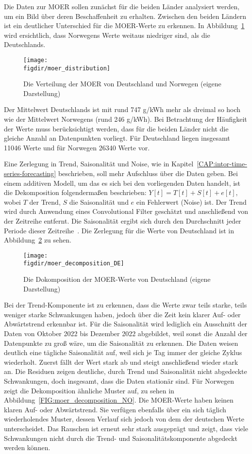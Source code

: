 Die Daten zur \ac{MOER} sollen zunächst für die beiden Länder analysiert werden, um ein Bild über deren Beschaffenheit zu erhalten.
Zwischen den beiden Ländern ist ein deutlicher Unterschied für die MOER-Werte zu erkennen.
In Abbildung~\ref{FIG:moer_distribution} wird ersichtlich, dass Norwegens Werte weitaus niedriger sind, als die Deutschlands.
\begin{figure}
 \caption[Verteilung MOER Deutschland und Norwegen]{Die Verteilung der MOER von Deutschland und Norwegen (eigene Darstellung)}
 {\texttt{[image: \\figdir/moer\_distribution]}}
 \label{FIG:moer_distribution}
\end{figure}
Der Mittelwert Deutschlands ist mit rund 747 g/\ac{kWh} mehr als dreimal so hoch wie der Mittelwert Norwegens (rund 246 g/\ac{kWh}).
Bei Betrachtung der Häufigkeit der Werte muss berücksichtigt werden, dass für die beiden Länder nicht die gleiche Anzahl an Datenpunkten vorliegt.
Für Deutschland liegen insgesamt 11046 Werte und für Norwegen 26340 Werte vor.

Eine Zerlegung in Trend, Saisonalität und Noise, wie in Kapitel~\ref{CAP:intor-time-series-forecasting} beschrieben, soll mehr Aufschluss über die Daten geben.
Bei einem additiven Modell, um das es sich bei den vorliegenden Daten handelt, ist die Dekomposition folgendermaßen beschrieben:
$Y[t] = T[t] + S[t] + e[t]$, wobei $T$ der Trend, $S$ die Saisonalität und $e$ ein Fehlerwert (Noise) ist.
Der Trend wird durch Anwendung eines Convolutional Filter geschätzt und anschließend von der Zeitreihe entfernt.
Die Saisonalität ergibt sich durch den Durchschnitt jeder Periode dieser Zeitreihe~\cite{JosefPerktold.2023}.
Die Zerlegung für die Werte von Deutschland ist in Abbildung~\ref{FIG:moer_decomposition_DE} zu sehen.
\begin{figure}
 \caption[Dekomposition der MOER Deutschlands]{Die Dokomposition der MOER-Werte von Deutschland (eigene Darstellung)}
 {\texttt{[image: \\figdir/moer\_decomposition\_DE]}}
 \label{FIG:moer_decomposition_DE}
\end{figure}
Bei der Trend-Komponente ist zu erkennen, dass die Werte zwar teils starke, teils weniger starke Schwankungen haben, jedoch über die Zeit kein klarer Auf- oder Abwärtstrend erkennbar ist.
Für die Saisonalität wird lediglich ein Ausschnitt der Daten von Oktober 2022 bis Dezember 2022 abgebildet, weil sonst die Anzahl der Datenpunkte zu groß wäre, um die Saisonalität zu erkennen.
Die Daten weisen deutlich eine tägliche Saisonalität auf, weil sich je Tag immer der gleiche Zyklus wiederholt.
Zuerst fällt der Wert stark ab und steigt anschließend wieder stark an.
Die Residuen zeigen deutliche, durch Trend und Saisonalität nicht abgedeckte Schwankungen, doch insgesamt, dass die Daten stationär sind.
Für Norwegen zeigt die Dekomposition  ähnliche Muster auf, zu sehen in Abbildung~\ref{FIG:moer_decomposition_NO}.
Die \ac{MOER}-Werte haben keinen klaren Auf- oder Abwärtstrend.
Sie verfügen ebenfalls über ein sich täglich wiederholendes Muster, dessen Verlauf sich jedoch von dem der deutschen Werte unterscheidet.
Das Rauschen ist erneut sehr stark ausgeprägt und zeigt, dass viele Schwankungen nicht durch die Trend- und Saisonalitätskomponente abgedeckt werden können.

